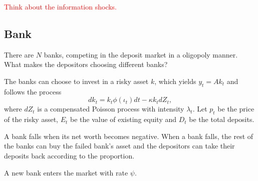 \documentclass[a4paper, 12pt]{article}
\begin{document}
\textcolor{red}{Think about the information shocks.}

\subsection{Bank}
There are $N$ banks, competing in the deposit market in a oligopoly 
manner. What makes the depositors choosing different banks?

The banks can choose to invest in a risky asset 
$k$, which yields $y_t = Ak_t$ and follows the process 
\begin{equation*}
    dk_t = k_t\phi(\iota_t)dt - \kappa k_tdZ_t, 
\end{equation*} 
where $dZ_t$ is a compensated Poisson process with intensity $\lambda_t$.
Let $p_t$ be the price of the risky asset, $E_t$ be the value of existing 
equity and $D_t$ be the total deposits. 


A bank falls when its net worth becomes negative. When a bank falls, the rest 
of the banks can buy the failed bank's asset and the depositors can take their 
deposits back according to the proportion. 

A new bank enters the market with rate $\psi$. 





\end{document}
